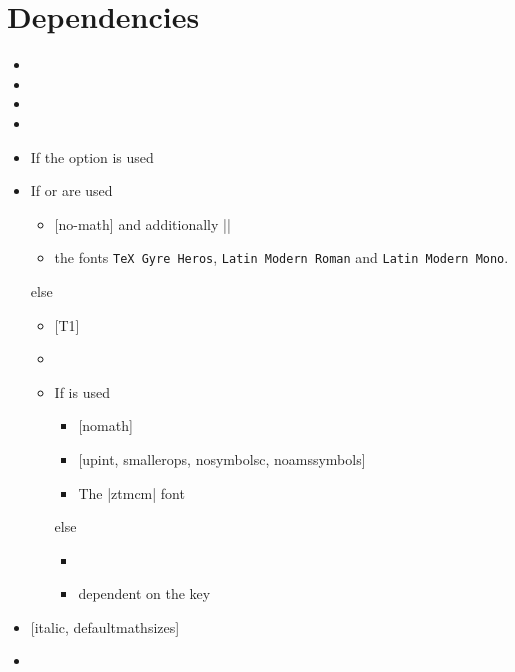 \section{Dependencies}
\begin{multicols}{2}%
  \begin{itemize}[leftmargin=10pt]
    \item {}
    \item {}
    \item {}
    \item {}
    \item If the  option is used 
    \item If  or  are used
      \begin{itemize}[topsep=0pt]
        \item {} [no-math] and additionally
          \bverb||
        \item the fonts \texttt{TeX Gyre Heros}, \texttt{Latin Mod\-ern Roman}
          and \texttt{Latin Modern Mono}.
      \end{itemize}
      else
      \begin{itemize}[topsep=0pt]
        \item {} [T1]
        \item {}
        \item If  is used
          \begin{itemize}[topsep=0pt]
            \item {} [nomath]
            \item {} [upint, smallerops, nosymbolsc, noamssymbols]
            \item The |ztmcm| font
          \end{itemize}
          else
          \begin{itemize}[topsep=0pt]
            \item {}
            \item {} dependent on the  key
          \end{itemize}
      \end{itemize}
    \item {} [italic, defaultmathsizes]
    \item {}
  \end{itemize}
\end{multicols}%

